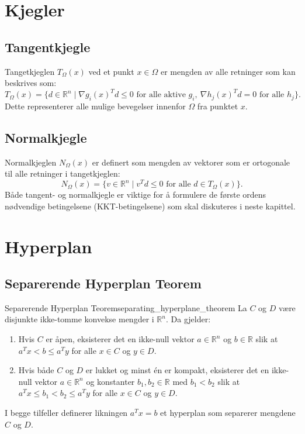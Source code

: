 \section{Kjegler}

\subsection{Tangentkjegle}
Tangetkjeglen \(T_{\Omega}(x)\) ved et punkt \(x \in \Omega\) er mengden av alle retninger som kan beskrives som:
\begin{equation*}
	T_{\Omega}(x) = \{d \in \mathbb{R}^n \mid \nabla g_i(x)^T d \leq 0 \text{ for alle aktive } g_i,\ \nabla h_j(x)^T d = 0 \text{ for alle } h_j\}.
\end{equation*}
Dette representerer alle mulige bevegelser innenfor \(\Omega\) fra punktet \(x\).

\subsection{Normalkjegle}
Normalkjeglen \(N_{\Omega}(x)\) er definert som mengden av vektorer som er ortogonale til alle retninger i tangetkjeglen:
\begin{equation*}
	N_{\Omega}(x) = \{v \in \mathbb{R}^n \mid v^T d \leq 0 \text{ for alle } d \in T_{\Omega}(x)\}.
\end{equation*}
Både tangent- og normalkjegle er viktige for å formulere de første ordens nødvendige betingelsene (KKT-betingelsene) som skal diskuteres i neste kapittel.

\section{Hyperplan}

\subsection{Separerende Hyperplan Teorem}
\begin{theorem}{Separerende Hyperplan Teorem}{separating_hyperplane_theorem}
	La \( C \) og \( D \) være disjunkte ikke-tomme konvekse mengder i \( \mathbb{R}^n \). Da gjelder:
	\begin{enumerate}
		\item Hvis \( C \) er åpen, eksisterer det en ikke-null vektor \( a \in \mathbb{R}^n \) og \( b \in \mathbb{R} \) slik at \( a^T x < b \leq a^T y \) for alle \( x \in C \) og \( y \in D \).
		\item Hvis både \( C \) og \( D \) er lukket og minst én er kompakt, eksisterer det en ikke-null vektor \( a \in \mathbb{R}^n \) og konstanter \( b_1, b_2 \in \mathbb{R} \) med \( b_1 < b_2 \) slik at \( a^T x \leq b_1 < b_2 \leq a^T y \) for alle \( x \in C \) og \( y \in D \).
	\end{enumerate}
	I begge tilfeller definerer likningen \(a^Tx = b\) et hyperplan som separerer mengdene \(C\) og \(D\).
\end{theorem}

